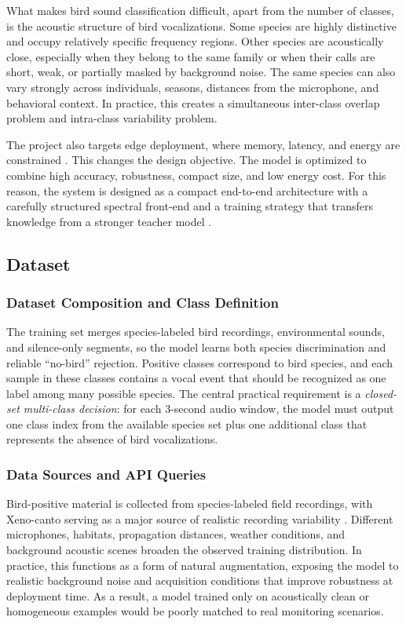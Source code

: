 \documentclass[a4paper,singleside,12pt]{report} %
\begin{document}
	What makes bird sound classification difficult, apart from the number of classes, is the acoustic structure of bird vocalizations. Some species are highly distinctive and occupy relatively specific frequency regions. Other species are acoustically close, especially when they belong to the same family or when their calls are short, weak, or partially masked by background noise. The same species can also vary strongly across individuals, seasons, distances from the microphone, and behavioral context. In practice, this creates a simultaneous inter-class overlap problem and intra-class variability problem.

	The project also targets edge deployment, where memory, latency, and energy are constrained \cite{audiomoth2019}. This changes the design objective. The model is optimized to combine high accuracy, robustness, compact size, and low energy cost. For this reason, the system is designed as a compact end-to-end architecture with a carefully structured spectral front-end and a training strategy that transfers knowledge from a stronger teacher model \cite{birdnet2021,hinton2015distilling}.

	\subsection{Dataset}
	\subsubsection{Dataset Composition and Class Definition}
		The training set merges species-labeled bird recordings, environmental sounds, and silence-only segments, so the model learns both species discrimination and reliable ``no-bird'' rejection. Positive classes correspond to bird species, and each sample in these classes contains a vocal event that should be recognized as one label among many possible species. The central practical requirement is a \emph{closed-set multi-class decision}: for each 3-second audio window, the model must output one class index from the available species set plus one additional class that represents the absence of bird vocalizations.

	\subsubsection{Data Sources and API Queries}
	Bird-positive material is collected from species-labeled field recordings, with Xeno-canto serving as a major source of realistic recording variability \cite{xenocanto}. Different microphones, habitats, propagation distances, weather conditions, and background acoustic scenes broaden the observed training distribution. In practice, this functions as a form of natural augmentation, exposing the model to realistic background noise and acquisition conditions that improve robustness at deployment time. As a result, a model trained only on acoustically clean or homogeneous examples would be poorly matched to real monitoring scenarios.
\end{document}
